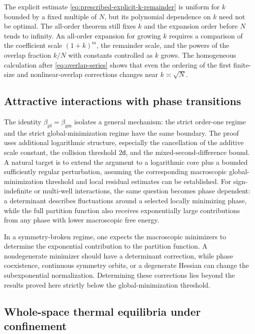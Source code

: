 \documentclass[11pt,reqno]{amsart}
\numberwithin{equation}{section}
\theoremstyle{plain}
\theoremstyle{definition}
\renewcommand{\d}{\mathsf d}
\newcommand{\gm}{\mathrm{gm}}
\newcommand{\pf}{\mathrm{pf}}
\begin{document}
The explicit estimate \eqref{eq:prescribed-explicit-k-remainder} is uniform for $k$ bounded by a fixed multiple of $N$, but its polynomial dependence on $k$ need not be optimal.  The all-order theorem still fixes $k$ and the expansion order before $N$ tends to infinity.  An all-order expansion for growing $k$ requires a comparison of the coefficient scale $(1+k)^m$, the remainder scale, and the powers of the overlap fraction $k/N$ with constants controlled as $k$ grows.  The homogeneous calculation after \eqref{eq:overlap-series} shows that even the ordering of the first finite-size and nonlinear-overlap corrections changes near $k\asymp\sqrt N$.

\subsection{Attractive interactions with phase transitions}

The identity $\beta_{\pf}=\beta_{\gm}$ isolates a general mechanism: the strict order-one regime and the strict global-minimization regime have the same boundary.  The proof uses additional logarithmic structure, especially the cancellation of the additive scale constant, the collision threshold $2\d$, and the mixed-second-difference bound.  A natural target is to extend the argument to a logarithmic core plus a bounded sufficiently regular perturbation, assuming the corresponding macroscopic global-minimization threshold and local residual estimates can be established.  For sign-indefinite or multi-well interactions, the same question becomes phase dependent: a determinant describes fluctuations around a selected locally minimizing phase, while the full partition function also receives exponentially large contributions from any phase with lower macroscopic free energy.

In a symmetry-broken regime, one expects the macroscopic minimizers to determine the exponential contribution to the partition function. A nondegenerate minimizer should have a determinant correction, while phase coexistence, continuous symmetry orbits, or a degenerate Hessian can change the subexponential normalization. Determining these corrections lies beyond the results proved here strictly below the global-minimization threshold.

\subsection{Whole-space thermal equilibria under confinement}
\end{document}
